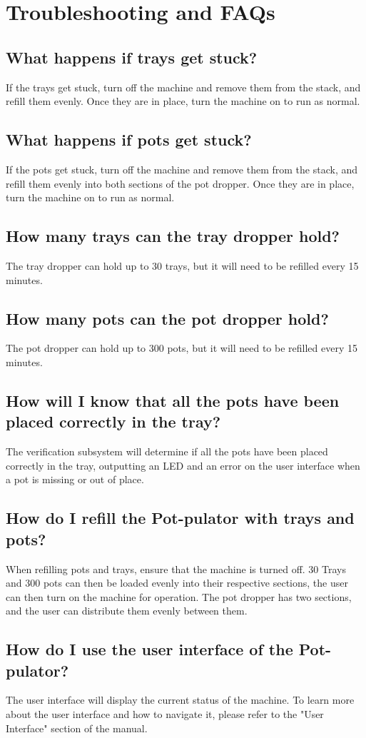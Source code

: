 \documentclass[12pt, titlepage]{article}
\begin{document}
\section{Troubleshooting and FAQs}
\subsection{What happens if trays get stuck?}
If the trays get stuck, turn off the machine and remove them from the stack, and refill them evenly. Once they are in place, turn the machine on to run as normal.
\subsection{What happens if pots get stuck?}
If the pots get stuck, turn off the machine and remove them from the stack, and refill them evenly into both sections of the pot dropper. Once they are in place, turn the machine on to run as normal.
\subsection{How many trays can the tray dropper hold?}
The tray dropper can hold up to 30 trays, but it will need to be refilled every 15 minutes.
\subsection{How many pots can the pot dropper hold?}
The pot dropper can hold up to 300 pots, but it will need to be refilled every 15 minutes.
\subsection{How will I know that all the pots have been placed correctly in the tray?}
The verification subsystem will determine if all the pots have been placed correctly in the tray, outputting an LED and an error on the user interface when a pot is missing or out of place.
\subsection{How do I refill the Pot-pulator with trays and pots?}
When refilling pots and trays, ensure that the machine is turned off. 30 Trays and 300 pots can then be loaded evenly into their respective sections, the user can then turn on the machine for operation. The pot dropper has two sections, and the user can distribute them evenly between them.
\subsection{How do I use the user interface of the Pot-pulator?}
The user interface will display the current status of the machine. To learn more about the user interface and how to navigate it, please refer to the "User Interface" section of the manual.
\end{document}
